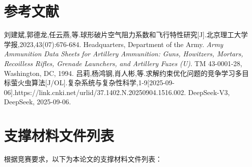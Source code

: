 \documentclass[fontset=SimSun]{ctexart}
\begin{document}
\section{参考文献}
\label{sec:references}

\begin{thebibliography}{99}
 刘建斌,郭德龙,任云燕,等.球形破片空气阻力系数和飞行特性研究[J].北京理工大学学报,2023,43(07):676-684.
 Headquarters, Department of the Army. \textit{Army Ammunition Data Sheets for Artillery Ammunition: Guns, Howitzers, Mortars, Recoilless Rifles, Grenade Launchers, and Artillery Fuzes (U)}. TM 43-0001-28, Washington, DC, 1994.
 吕莉,杨鸿钢,肖人彬,等.求解约束优化问题的竞争学习多目标萤火虫算法[J/OL].复杂系统与复杂性科学,1-9[2025-09-06].https://link.cnki.net/urlid/37.1402.N.20250904.1516.002.
 DeepSeek-V3, DeepSeek, 2025-09-06.
\end{thebibliography}
\newpage
\section{支撑材料文件列表}
\label{sec:support_materials}

根据竞赛要求，以下为本论文的支撑材料文件列表：
\end{document}
